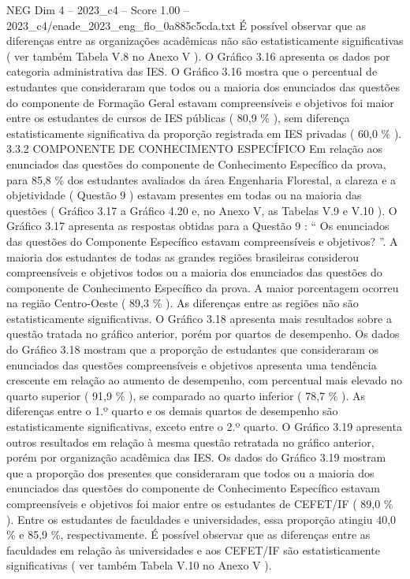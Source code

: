 \begin{textsample}{NEG Dim 4 – 2023\_c4 – Score 1.00 – 2023\_c4/enade\_2023\_eng\_flo\_0a885c5cda.txt}
É possível observar que as diferenças entre as organizações acadêmicas não são estatisticamente significativas ( ver também Tabela V.8 no Anexo V ).
O Gráfico 3.16 apresenta os dados por categoria administrativa das IES.
O Gráfico 3.16 mostra que o percentual de estudantes que consideraram que todos ou a maioria dos enunciados das questões do componente de Formação Geral estavam compreensíveis e objetivos foi maior entre os estudantes de cursos de IES públicas ( 80,9 \% ), sem diferença estatisticamente significativa da proporção registrada em IES privadas ( 60,0 \% ). 3.3.2 COMPONENTE DE CONHECIMENTO ESPECÍFICO Em relação aos enunciados das questões do componente de Conhecimento Específico da prova, para 85,8 \% dos estudantes avaliados da área Engenharia Florestal, a clareza e a objetividade ( Questão 9 ) estavam presentes em todas ou na maioria das questões ( Gráfico 3.17 a Gráfico 4.20 e, no Anexo V, as Tabelas V.9 e V.10 ).
O Gráfico 3.17 apresenta as respostas obtidas para a Questão 9 : “ Os enunciados das questões do Componente Específico estavam compreensíveis e objetivos? ”.
A maioria dos estudantes de todas as grandes regiões brasileiras considerou compreensíveis e objetivos todos ou a maioria dos enunciados das questões do componente de Conhecimento Específico da prova.
A maior porcentagem ocorreu na região Centro-Oeste ( 89,3 \% ).
As diferenças entre as regiões não são estatisticamente significativas.
O Gráfico 3.18 apresenta mais resultados sobre a questão tratada no gráfico anterior, porém por quartos de desempenho.
Os dados do Gráfico 3.18 mostram que a proporção de estudantes que consideraram os enunciados das questões compreensíveis e objetivos apresenta uma tendência crescente em relação ao aumento de desempenho, com percentual mais elevado no quarto superior ( 91,9 \% ), se comparado ao quarto inferior ( 78,7 \% ).
As diferenças entre o 1.º quarto e os demais quartos de desempenho são estatisticamente significativas, exceto entre o 2.º quarto.
O Gráfico 3.19 apresenta outros resultados em relação à mesma questão retratada no gráfico anterior, porém por organização acadêmica das IES.
Os dados do Gráfico 3.19 mostram que a proporção dos presentes que consideraram que todos ou a maioria dos enunciados das questões do componente de Conhecimento Específico estavam compreensíveis e objetivos foi maior entre os estudantes de CEFET/IF ( 89,0 \% ).
Entre os estudantes de faculdades e universidades, essa proporção atingiu 40,0 \% e 85,9 \%, respectivamente.
É possível observar que as diferenças entre as faculdades em relação às universidades e aos CEFET/IF são estatisticamente significativas ( ver também Tabela V.10 no Anexo V ).

\end{textsample}

